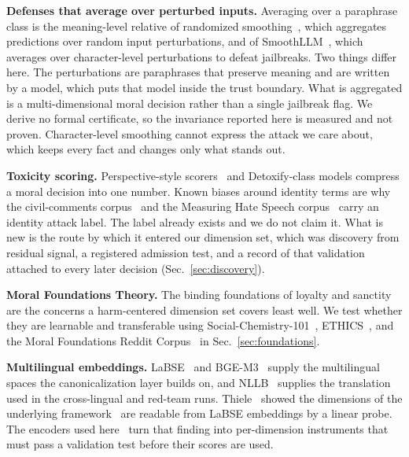 \documentclass[journal]{IEEEtran}
\begin{document}
\textbf{Defenses that average over perturbed inputs.} Averaging over a
paraphrase class is the meaning-level relative of randomized
smoothing~\cite{cohen2019certified}, which aggregates predictions over random
input perturbations, and of SmoothLLM~\cite{robey2023smoothllm}, which
averages over character-level perturbations to defeat jailbreaks. Two things
differ here. The perturbations are paraphrases that preserve meaning and are
written by a model, which puts that model inside the trust boundary. What is
aggregated is a multi-dimensional moral decision rather than a single
jailbreak flag. We derive no formal certificate, so the invariance reported
here is measured and not proven. Character-level smoothing cannot express the
attack we care about, which keeps every fact and changes only what stands
out.

\textbf{Toxicity scoring.} Perspective-style
scorers~\cite{borkan2019nuanced} and Detoxify-class models compress a moral
decision into one number. Known biases around identity terms are why the
civil-comments corpus~\cite{borkan2019nuanced} and the Measuring Hate Speech
corpus~\cite{kennedy2020constructing} carry an identity attack label. The
label already exists and we do not claim it. What is new is the route by
which it entered our dimension set, which was discovery from residual signal,
a registered admission test, and a record of that validation attached to
every later decision (Sec.~\ref{sec:discovery}).

\textbf{Moral Foundations Theory.} The binding foundations of loyalty and
sanctity~\cite{graham2013moral} are the concerns a harm-centered dimension
set covers least well. We test whether they are learnable and transferable
using Social-Chemistry-101~\cite{forbes2020social},
ETHICS~\cite{hendrycks2021aligning}, and the Moral Foundations Reddit
Corpus~\cite{trager2022moral} in Sec.~\ref{sec:foundations}.

\textbf{Multilingual embeddings.} LaBSE~\cite{feng2022labse} and
BGE-M3~\cite{chen2024bge} supply the multilingual spaces the canonicalization
layer builds on, and NLLB~\cite{nllbteam2022no} supplies the translation used
in the cross-lingual and red-team runs. Thiele~\cite{thiele2026labse} showed
the dimensions of the underlying framework~\cite{bond2026geometric} are
readable from LaBSE embeddings by a linear probe. The encoders used
here~\cite{xbse} turn that finding into per-dimension instruments that must
pass a validation test before their scores are used.

\end{document}
